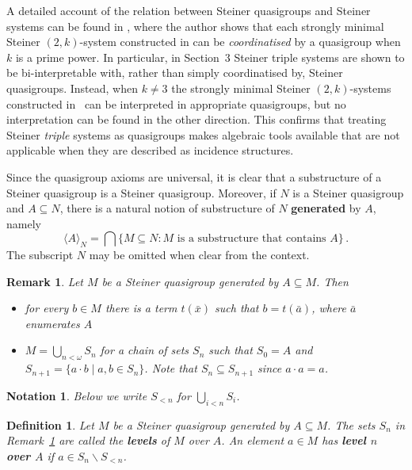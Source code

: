 \documentclass[a4paper, 11pt]{article}
\theoremstyle{note}
\newtheorem{df}[thm]{Definition}
\newtheorem{rmk}[thm]{Remark}
\newtheorem*{notation}{Notation}
\begin{document}
 A detailed account of the relation between Steiner quasigroups and Steiner systems can be found in \cite{baldwin23}, 
where the author shows that each strongly minimal Steiner $(2,k)$-system constructed in \cite{baldwin-pao} can be \textit{coordinatised} by a quasigroup when $k$ is a prime power. In particular, in Section~3 Steiner triple systems are shown to be bi-interpretable with, rather than simply coordinatised by, Steiner quasigroups. Instead, when $k \neq 3$ the strongly minimal Steiner $(2,k)$-systems constructed in~\cite{baldwin-pao} can be interpreted in appropriate quasigroups, but no interpretation can be found in the other direction. 
This confirms that treating Steiner \textit{triple} systems as quasigroups makes algebraic tools available that are not applicable when they are described as incidence structures.

Since the quasigroup axioms are universal, it is clear that a substructure of a Steiner quasigroup is a Steiner quasigroup. Moreover, if $N$ is a Steiner quasigroup and  $A \subseteq N$, there is a natural notion of substructure of $N$  \textbf{generated} by $A$, namely
\[ \langle A \rangle_N = \bigcap \{ M\subseteq N : M \mbox{ is a substructure that contains } A \} \,.\]
The subscript $N$ may be omitted %
when clear from the context.

\begin{rmk}\label{May12_1} Let $M$ be a Steiner quasigroup generated by $A\subseteq M$.  Then
\begin{itemize}
\item for every $b \in M$ there is a term $t(\bar{x})$ such that $b=t(\bar{a})$, where $\bar{a}$ enumerates $A$
\item $M=\bigcup_{n<\omega} S_n$ for a chain of sets $S_n$ such that  $S_0 =A$ and $S_{n+1}= \{a\cdot b\mid a,b\in S_n\}$. Note that $S_n\subseteq S_{n+1}$  since  $a\cdot a = a$.
\end{itemize}
	\end{rmk}
	
	\begin{notation} Below we write $S_{<n}$ for $\bigcup_{i<n} S_i$. \end{notation}
	
	
	\begin{df} Let $M$ be a Steiner quasigroup generated by $A\subseteq M$. The sets $S_n$ in Remark~\ref{May12_1} are called the \textbf{levels} of $M$ over $A$. An element $a\in M$ has   \textbf{level $n$ over $A$}  if $a\in S_n\smallsetminus S_{<n}$. %
	\end{df}
\end{document}
